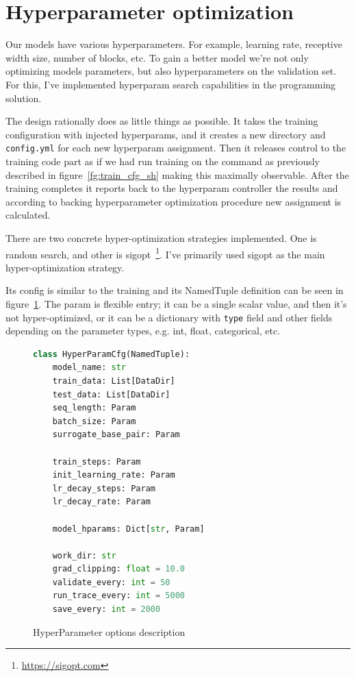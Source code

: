 \documentclass[times, utf8, diplomski, english]{fer}
\begin{document}
\section{Hyperparameter optimization}

Our models have various hyperparameters. For example, learning rate, receptive width size, number of blocks, etc. To gain a better model we're not only optimizing models parameters, but also hyperparameters on the validation set. For this, I've implemented hyperparam search capabilities in the programming solution. 

The design rationally does as little things as possible. It takes the training configuration with injected hyperparams, and it creates a new directory and \texttt{config.yml} for each new hyperparam assignment. Then it releases control to the training code part as if we had run training on the command as previously described in figure~\ref{fg:train_cfg_sh} making this maximally observable. After the training completes it reports back to the hyperparam controller the results and according to backing hyperparameter optimization procedure new assignment is calculated.

There are two concrete hyper-optimization strategies implemented. One is random search, and other is sigopt~\footnote{\url{https://sigopt.com}}. 
I've primarily used sigopt as the main hyper-optimization strategy.

Its config is similar to the training and its NamedTuple definition can be seen in figure~\ref{fg:hyper_cfg_py}. The param is flexible entry; it can be a single scalar value, and then it's not hyper-optimized, or it can be a dictionary with \texttt{type} field and other fields depending on the parameter types, e.g. int, float, categorical, etc. 

\begin{figure}
    \begin{center}
    \begin{lstlisting}[language=python,style=protobuf]
class HyperParamCfg(NamedTuple):
    model_name: str
    train_data: List[DataDir]
    test_data: List[DataDir]
    seq_length: Param
    batch_size: Param
    surrogate_base_pair: Param

    train_steps: Param
    init_learning_rate: Param
    lr_decay_steps: Param
    lr_decay_rate: Param

    model_hparams: Dict[str, Param]

    work_dir: str
    grad_clipping: float = 10.0
    validate_every: int = 50
    run_trace_every: int = 5000
    save_every: int = 2000
    \end{lstlisting}
    \caption{HyperParameter options description}
    \label{fg:hyper_cfg_py}
    \end{center}
\end{figure}
\end{document}

